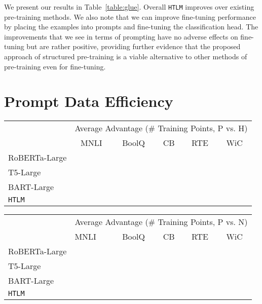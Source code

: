 \documentclass[11pt,a4paper]{article}
\newif\ifshownlg
\newcommand{\HTLM}{\texttt{HTLM}}
\begin{document}
\begin{table*}[ht]
\begin{tabular}{@{}lcccccccc@{}}
\end{tabular}
\caption{Results on the GLUE development set for various fine-tuning methods
applied to \HTLM{}.}
\label{table:glue}
\end{table*}

We present our results in Table~\ref{table:glue}. Overall \HTLM{} improves over existing pre-training methods. We also note that we can improve fine-tuning performance by placing the examples into prompts and fine-tuning the classification head. The improvements that we see in terms of prompting have no adverse effects on fine-tuning but are rather positive, providing further evidence that the proposed approach of structured pre-training is a viable alternative to other methods of pre-training even for fine-tuning.

\ifshownlg We also show our fine-tuning results for the table-to-text generation datasets in Table~\ref{tab:table-to-text}. Similar to GLUE fine-tuning, we place all NLG samples into a prompt while fine-tuning. \HTLM{} fine-tuned is able to outperform both variants of the GPT-2 model consistently.\fi
\section{Prompt Data Efficiency}
\begin{table*}[htpb!]
\centering
\begin{tabular}{@{}l ccccc@{}}
\toprule 
& \multicolumn{5}{c}{Average Advantage (\# Training Points, P vs. H)} \\
& MNLI & BoolQ & CB & RTE & WiC\\\midrule 
RoBERTa-Large &  &  &  &  & \\
T5-Large &  &  &  &  & \\
BART-Large &  &  &  &  & \\ \midrule
\HTLM{} &  &  &  &  & \\
\bottomrule
\end{tabular}
\caption{Average advantage (higher is better)  in terms of training points for fine-tuning well-structured prompt () against a classical classification head ().}
\label{table:data_points_per_prompt_p_h}
\end{table*}

\begin{table*}[htpb!]
\centering
\begin{tabular}{@{}l lcccc@{}}
\toprule 
& \multicolumn{5}{c}{Average Advantage (\# Training Points, P vs. N)} \\
& MNLI & BoolQ & CB & RTE & WiC\\\midrule 
RoBERTa-Large &  &  &  &  & \\
T5-Large &  &  &  &  & \\
BART-Large &  &  &  &  & \\ \midrule
\HTLM{} &  &  &  &  & \\
\bottomrule
\end{tabular}
\caption{Average advantage (higher is better) in terms of training points for fine-tuning well-structured prompt () against a prompt with a non-sensical verbalizer (). }
\label{table:data_points_per_prompt_p_n}
\end{table*}
\end{document}

